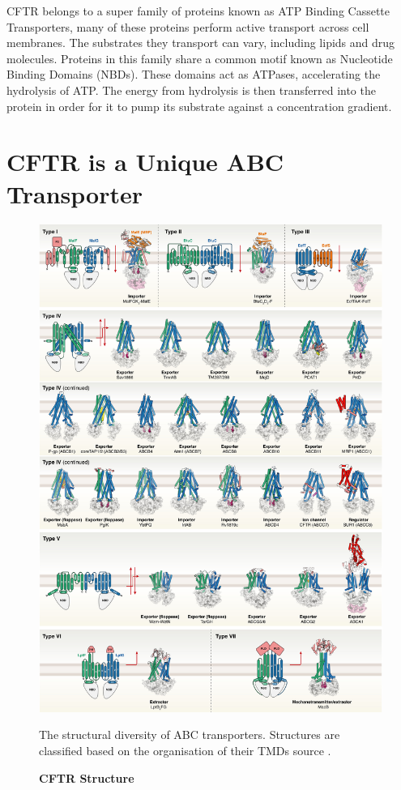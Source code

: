 CFTR belongs to a super family of proteins known as ATP Binding Cassette Transporters,  many of these proteins perform active transport across cell membranes. The substrates they transport can vary, including lipids and drug molecules. Proteins in this family share a common motif known as Nucleotide Binding Domains (NBDs). These domains act as ATPases, accelerating the hydrolysis of ATP. The energy from hydrolysis is then transferred into the protein in order for it to pump its substrate against a concentration gradient. 

\section{CFTR is a Unique ABC Transporter}

\begin{figure}
	\label{ABC_diversity}
	\begin{center}
	\includegraphics[width=\textwidth]{figures/ABC_classification.jpg}
	\end{center}
	\captionsetup{singlelinecheck = false, justification=raggedright}
	\caption[CFTR Structure] {\textbf{CFTR Structure}}{The structural diversity of ABC transporters. Structures are classified based on the organisation of their TMDs source \cite{thomas2020}.} 
\end{figure}
